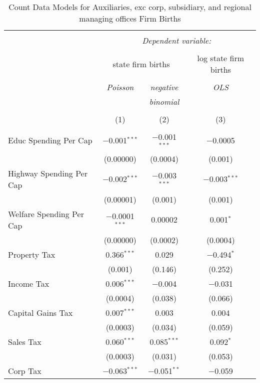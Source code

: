 
\begin{table}[!htbp] \centering 
  \caption{Count Data Models for Auxiliaries, exc corp, subsidiary, and regional managing offices Firm Births} 
  \label{} 
\begin{tabular}{@{\extracolsep{5pt}}lccc} 
\\[-1.8ex]\hline 
\hline \\[-1.8ex] 
 & \multicolumn{3}{c}{\textit{Dependent variable:}} \\ 
\cline{2-4} 
\\[-1.8ex] & \multicolumn{2}{c}{state firm births} & log state firm births \\ 
\\[-1.8ex] & \textit{Poisson} & \textit{negative} & \textit{OLS} \\ 
 & \textit{} & \textit{binomial} & \textit{} \\ 
\\[-1.8ex] & (1) & (2) & (3)\\ 
\hline \\[-1.8ex] 
 Educ Spending Per Cap & $-$0.001$^{***}$ & $-$0.001$^{***}$ & $-$0.0005 \\ 
  & (0.00000) & (0.0004) & (0.001) \\ 
  Highway Spending Per Cap  & $-$0.002$^{***}$ & $-$0.003$^{***}$ & $-$0.003$^{***}$ \\ 
  & (0.00001) & (0.001) & (0.001) \\ 
  Welfare Spending Per Cap  & $-$0.0001$^{***}$ & 0.00002 & 0.001$^{*}$ \\ 
  & (0.00000) & (0.0002) & (0.0004) \\ 
  Property Tax & 0.366$^{***}$ & 0.029 & $-$0.494$^{*}$ \\ 
  & (0.001) & (0.146) & (0.252) \\ 
  Income Tax & 0.006$^{***}$ & $-$0.004 & $-$0.031 \\ 
  & (0.0004) & (0.038) & (0.066) \\ 
  Capital Gains Tax & 0.007$^{***}$ & 0.003 & 0.004 \\ 
  & (0.0003) & (0.034) & (0.059) \\ 
  Sales Tax & 0.060$^{***}$ & 0.085$^{***}$ & 0.092$^{*}$ \\ 
  & (0.0003) & (0.031) & (0.053) \\ 
  Corp Tax & $-$0.063$^{***}$ & $-$0.051$^{**}$ & $-$0.059 \\ 

\end{tabular}
\end{table}

